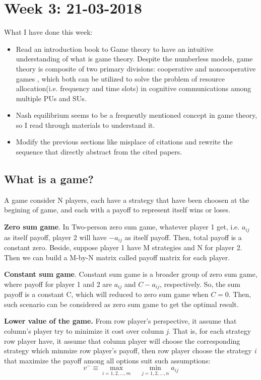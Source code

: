 \documentclass[journal]{IEEEtran}
\begin{document}
\section{Week 3: 21-03-2018}
What I have done this week:
\begin{itemize}
  \item Read an introduction book to Game theory \cite{barron2013game} to have an intuitive understanding of what is game theory. Despite the numberless models, game theory is composite of two primary divisions: cooperative and noncooperative games \cite{barron2013game}, which both can be utilized to solve the problem of resource allocation(i.e. frequency and time slots) in cognitive communications among multiple PUs and SUs.
  \item Nash equilibrium seems to be a freqneutly mentioned concept in game theory, so I read through materials to understand it.
  \item Modify the previous sections like misplace of citations and rewrite the sequence that directly abstract from the cited papers.
\end{itemize}
\subsection{What is a game?}
A game consider N players, each have a strategy that have been choosen at the begining of game, and each with a payof\/f to represent itself wins or loses.


\textbf{Zero sum game}. In Two-person zero sum game, whatever player 1 get, i.e. $a_{ij}$ as itself payof\/f, player 2 will have $-a_{ij}$ as itself payof\/f. Then, total payof\/f is a constant zero. Beside, suppose player 1 have M strategies and N for player 2. Then we can build a M-by-N matrix called payof\/f matrix for each player.


\textbf{Constant sum game}. Constant sum game is a broader group of zero sum game, where payof\/f for player 1 and 2 are $a_{ij}$ and $C - a_{ij}$, respectively. So, the sum payoff is a constant C, which will reduced to zero sum game when $C=0$. Then, such scenario can be considered as zero sum game to get the optimal result.


\textbf{Lower value of the game.} From row player's perspective, it assume that column's player try to minimize it cost over column \textsl{j}. That is, for each strategy row player have, it assume that column player will choose the corresponding strategy which minmize row player's payoff, then row player choose the strategy  \textsl{i} that maximize the payoff among all options suit such assumptions:
\begin{equation}
  v^- \equiv \max \limits_{i=1,2,...,m} \quad \min \limits_{j=1,2,...,n} a_{ij}
\end{equation}
\end{document}
